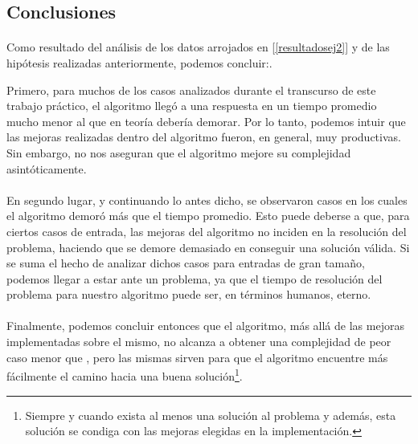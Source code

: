 \subsection{Conclusiones}

\paragraph{}
Como resultado del análisis de los datos arrojados en [\ref{resultadosej2}] y de las hipótesis realizadas anteriormente, podemos concluir:.

Primero, para muchos de los casos analizados durante el transcurso de este trabajo práctico, el algoritmo llegó a una respuesta en un tiempo promedio mucho menor al que en teoría debería demorar. Por lo tanto, podemos intuir que las mejoras realizadas dentro del algoritmo fueron, en general, muy productivas. Sin embargo, no nos aseguran que el algoritmo mejore su complejidad asintóticamente.

\paragraph{}
En segundo lugar, y continuando lo antes dicho, se observaron casos en los cuales el algoritmo demoró más que el tiempo promedio. Esto puede deberse a que, para ciertos casos de entrada, las mejoras del algoritmo no inciden en la resolución del problema, haciendo que se demore demasiado en conseguir una solución válida. Si se suma el hecho de analizar dichos casos para entradas de gran tamaño, podemos llegar a estar ante un problema, ya que el tiempo de resolución del problema para nuestro algoritmo puede ser, en términos humanos, eterno.

\paragraph{}
Finalmente, podemos concluir entonces que el algoritmo, más allá de las mejoras implementadas sobre el mismo, no alcanza a obtener una complejidad de peor caso menor que , pero las mismas sirven para que el algoritmo encuentre más fácilmente el camino hacia una buena solución\footnote{Siempre y cuando exista al menos una solución al problema y además, esta solución se condiga con las mejoras elegidas en la implementación.}.

